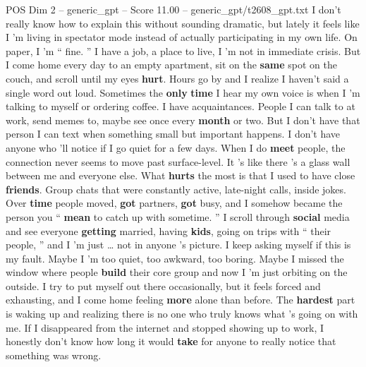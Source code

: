 \begin{textsample}{POS Dim 2 – generic\_gpt – Score 11.00 – generic\_gpt/t2608\_gpt.txt}  \label{ex:f2_pos_034}
I don't really know how to explain this without sounding dramatic, but lately it feels like I ’m living in spectator mode instead of actually participating in my own life.
On paper, I ’m “ fine. ” I have a job, a place to live, I ’m not in immediate crisis.
But I come home every day to an empty apartment, sit on the \textbf{same} spot on the couch, and scroll until my eyes \textbf{hurt}.
Hours go by and I realize I haven't said a single word out loud.
Sometimes the \textbf{only} \textbf{time} I hear my own voice is when I ’m talking to myself or ordering coffee.
I have acquaintances.
People I can talk to at work, send memes to, maybe see once every \textbf{month} or two.
But I don't have that person I can text when something small but important happens.
I don't have anyone who ’ll notice if I go quiet for a few days.
When I do \textbf{meet} people, the connection never seems to move past surface-level.
It ’s like there ’s a glass wall between me and everyone else.
What \textbf{hurts} the most is that I used to have close \textbf{friends}.
Group chats that were constantly active, late-night calls, inside jokes.
Over \textbf{time} people moved, \textbf{got} partners, \textbf{got} busy, and I somehow became the person you “ \textbf{mean} to catch up with sometime. ” I scroll through \textbf{social} media and see everyone \textbf{getting} married, having \textbf{kids}, going on trips with “ their people, ” and I ’m just … not in anyone ’s picture.
I keep asking myself if this is my fault.
Maybe I ’m too quiet, too awkward, too boring.
Maybe I missed the window where people \textbf{build} their core group and now I ’m just orbiting on the outside.
I try to put myself out there occasionally, but it feels forced and exhausting, and I come home feeling \textbf{more} alone than before.
The \textbf{hardest} part is waking up and realizing there is no one who truly knows what ’s going on with me.
If I disappeared from the internet and stopped showing up to work, I honestly don't know how long it would \textbf{take} for anyone to really notice that something was wrong.

\end{textsample}
